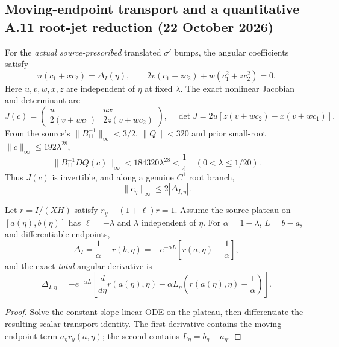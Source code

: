 \subsection*{Moving-endpoint transport and a quantitative A.11 root-jet reduction (22 October 2026)}
\label{subsec:a11-moving-endpoint-jet-20261022}
For the \emph{actual source-prescribed} translated $\sigma'$ bumps, the angular coefficients satisfy
\[
u(c_1+xc_2)=\Delta_I(\eta),\qquad
2v(c_1+zc_2)+w(c_1^2+zc_2^2)=0.
\]
Here $u,v,w,x,z$ are independent of $\eta$ at fixed $\lambda$.
The exact nonlinear Jacobian and determinant are
\[
J(c)=\begin{pmatrix}u&ux\\2(v+wc_1)&2z(v+wc_2)\end{pmatrix},
\quad
\det J=2u[z(v+wc_2)-x(v+wc_1)].
\]
From the source's $\|B_{11}^{-1}\|_\infty<3/2$,
$\|Q\|<320$ and prior small-root $\|c\|_\infty\le192\lambda^{28}$,
\[
\|B_{11}^{-1}DQ(c)\|_\infty
<184320\lambda^{28}<\frac14
\quad(0<\lambda\le1/20).
\]
Thus $J(c)$ is invertible, and along a genuine $C^1$ root branch,
\begin{equation}\label{eq:a11-jet-reduction-20261022}
\boxed{\ \|c_\eta\|_\infty\le2|\Delta_{I,\eta}|.\ }
\end{equation}

\begin{proposition}
Let $r=I/(XH)$ satisfy $r_y+(1+\ell)r=1$.
Assume the source plateau on $[a(\eta),b(\eta)]$ has
$\ell=-\lambda$ and $\lambda$ independent of $\eta$.
For $\alpha=1-\lambda$, $L=b-a$, and differentiable endpoints,
\[
\Delta_I=\frac1\alpha-r(b,\eta)
=-e^{-\alpha L}\left[r(a,\eta)-\frac1\alpha\right],
\]
and the exact \emph{total} angular derivative is
\begin{equation}\label{eq:a11-moving-endpoint-identity-20261022}
\boxed{\ \Delta_{I,\eta}=-e^{-\alpha L}
\left[\frac{d}{d\eta}r(a(\eta),\eta)
-\alpha L_\eta\left(r(a(\eta),\eta)-\frac1\alpha\right)\right].\ }
\end{equation}
\end{proposition}
\begin{proof}
Solve the constant-slope linear ODE on the plateau, then differentiate
the resulting scalar transport identity. The first derivative contains
the moving endpoint term $a_\eta r_y(a,\eta)$; the second
contains $L_\eta=b_\eta-a_\eta$.
\end{proof}

